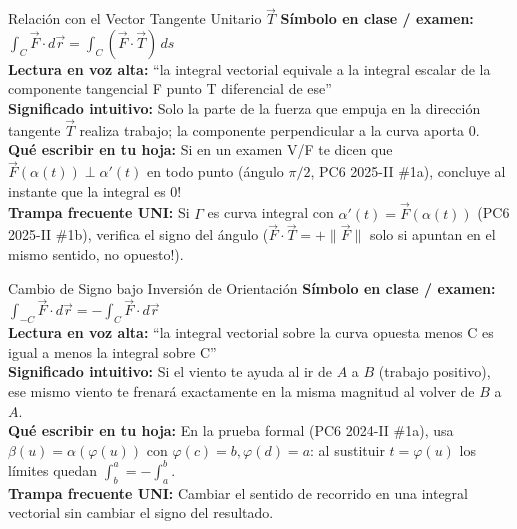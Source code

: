\documentclass[11pt,a4paper]{article}
\begin{document}
\begin{definicionbox}{Relación con el Vector Tangente Unitario $\vec{T}$}
\textbf{Símbolo en clase / examen:} $\int_C \vec{F} \cdot d\vec{r} = \int_C (\vec{F} \cdot \vec{T})\,ds$\\[0.15cm]
\textbf{Lectura en voz alta:} ``la integral vectorial equivale a la integral escalar de la componente tangencial F punto T diferencial de ese''\\[0.12cm]
\textbf{Significado intuitivo:} Solo la parte de la fuerza que empuja en la dirección tangente $\vec{T}$ realiza trabajo; la componente perpendicular a la curva aporta $0$.\\[0.12cm]
\textbf{Qué escribir en tu hoja:} Si en un examen V/F te dicen que $\vec{F}(\alpha(t)) \perp \alpha'(t)$ en todo punto (ángulo $\pi/2$, PC6 2025-II \#1a), concluye al instante que la integral es $0$!\\[0.12cm]
\textbf{Trampa frecuente UNI:} Si $\Gamma$ es curva integral con $\alpha'(t) = \vec{F}(\alpha(t))$ (PC6 2025-II \#1b), verifica el signo del ángulo ($\vec{F}\cdot\vec{T} = +\|\vec{F}\|$ solo si apuntan en el mismo sentido, no opuesto!).
\end{definicionbox}

\begin{definicionbox}{Cambio de Signo bajo Inversión de Orientación}
\textbf{Símbolo en clase / examen:} $\int_{-C} \vec{F} \cdot d\vec{r} = -\int_C \vec{F} \cdot d\vec{r}$\\[0.15cm]
\textbf{Lectura en voz alta:} ``la integral vectorial sobre la curva opuesta menos C es igual a menos la integral sobre C''\\[0.12cm]
\textbf{Significado intuitivo:} Si el viento te ayuda al ir de $A$ a $B$ (trabajo positivo), ese mismo viento te frenará exactamente en la misma magnitud al volver de $B$ a $A$.\\[0.12cm]
\textbf{Qué escribir en tu hoja:} En la prueba formal (PC6 2024-II \#1a), usa $\beta(u) = \alpha(\varphi(u))$ con $\varphi(c)=b, \varphi(d)=a$: al sustituir $t=\varphi(u)$ los límites quedan $\int_b^a = -\int_a^b$.\\[0.12cm]
\textbf{Trampa frecuente UNI:} Cambiar el sentido de recorrido en una integral vectorial sin cambiar el signo del resultado.
\end{definicionbox}
\end{document}
